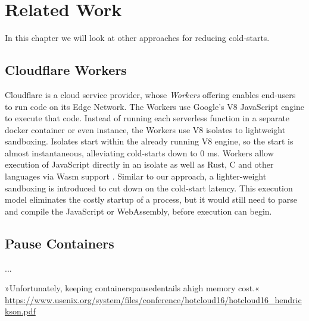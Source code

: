 \chapter{Related Work}

In this chapter we will look at other approaches for reducing cold-starts.

\section{Cloudflare Workers}

Cloudflare is a cloud service provider, whose \emph{Workers} offering enables end-users to run code on its Edge Network. The Workers use Google's V8 JavaScript engine to execute that code.
Instead of running each serverless function in a separate docker container or even  instance, the Workers use V8 isolates to lightweight sandboxing. Isolates start within the already running V8 engine, so the start is almost instantaneous, alleviating cold-starts down to 0 ms.
Workers allow execution of JavaScript directly in an isolate as well as Rust, C and other languages via Wasm support \cite{Cloudflare2021}.
Similar to our approach, a lighter-weight sandboxing is introduced to cut down on the cold-start latency. This execution model eliminates the costly startup of a  process, but it would still need to parse and compile the JavaScript or WebAssembly, before execution can begin.


\section{Pause Containers}

\citeauthor{Mohan2019} ...

»Unfortunately, keeping containerspausedentails ahigh memory cost.«
\url{https://www.usenix.org/system/files/conference/hotcloud16/hotcloud16_hendrickson.pdf}